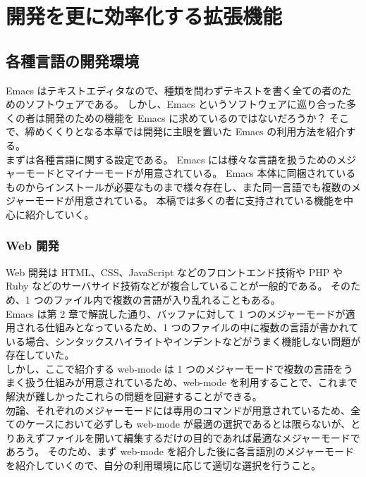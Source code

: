\chapter{開発を更に効率化する拡張機能}
\section{各種言語の開発環境}
Emacs はテキストエディタなので、種類を問わずテキストを書く全ての者のためのソフトウェアである。
しかし、Emacs というソフトウェアに巡り合った多くの者は開発のための機能を Emacs に求めているのではないだろうか？
そこで、締めくくりとなる本章では開発に主眼を置いた Emacs の利用方法を紹介する。\\

まずは各種言語に関する設定である。
Emacs には様々な言語を扱うためのメジャーモードとマイナーモードが用意されている。
Emacs 本体に同梱されているものからインストールが必要なものまで様々存在し、また同一言語でも複数のメジャーモードが用意されている。
本稿では多くの者に支持されている機能を中心に紹介していく。
\subsection{Web 開発}
Web 開発は HTML、CSS、JavaScript などのフロントエンド技術や PHP や Ruby などのサーバサイド技術などが複合していることが一般的である。
そのため、1 つのファイル内で複数の言語が入り乱れることもある。\\

Emacs は第 2 章で解説した通り、バッファに対して 1 つのメジャーモードが適用される仕組みとなっているため、1 つのファイルの中に複数の言語が書かれている場合、シンタックスハイライトやインデントなどがうまく機能しない問題が存在していた。\\

しかし、ここで紹介する web-mode は 1 つのメジャーモードで複数の言語をうまく扱う仕組みが用意されているため、web-mode を利用することで、これまで解決が難しかったこれらの問題を回避することができる。\\

勿論、それぞれのメジャーモードには専用のコマンドが用意されているため、全てのケースにおいて必ずしも web-mode が最適の選択であるとは限らないが、とりあえずファイルを開いて編集するだけの目的であれば最適なメジャーモードであろう。
そのため、まず web-mode を紹介した後に各言語別のメジャーモードを紹介していくので、自分の利用環境に応じて適切な選択を行うこと。
